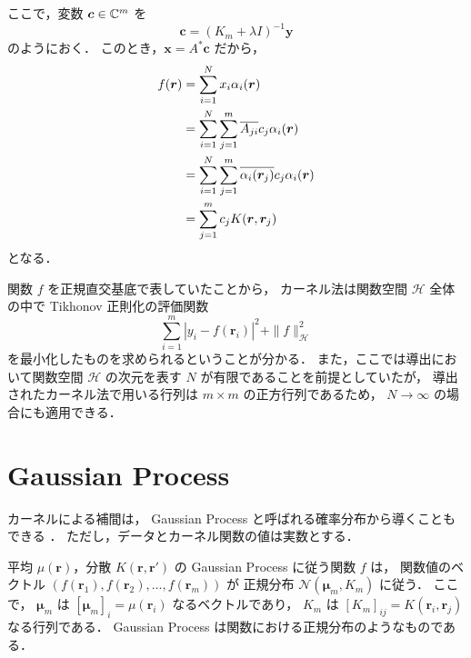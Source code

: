 ここで，変数 $\bm{c} \in \mathbb{C}^m$ を
\begin{equation}
    \bm{c} = (K_m + \lambda I)^{-1} \bm{y}
    \label{eq:interp_kernel_tikhonov_coeff_c}
\end{equation}
のようにおく．
このとき，$\bm{x} = A^* \bm{c}$ だから，
\begin{align}
    f(\bm{r})
     & = \sum_{i = 1}^{N} x_i \alpha_i(\bm{r}) \notag                                                \\
     & = \sum_{i = 1}^{N} \sum_{j = 1}^{m} \overline{A_{ji}} c_j \alpha_i(\bm{r}) \notag             \\
     & = \sum_{i = 1}^{N} \sum_{j = 1}^{m} \overline{\alpha_i(\bm{r}_j)} c_j \alpha_i(\bm{r}) \notag \\
     & = \sum_{j = 1}^{m} c_j K(\bm{r}, \bm{r}_j)
\end{align}
となる．

関数 $f$ を正規直交基底で表していたことから，
カーネル法は関数空間 $\mathcal{H}$ 全体の中で Tikhonov 正則化の評価関数
\begin{equation}
    \sum_{i=1}^m \left|y_i - f(\bm{r}_i)\right|^2
    + \|f\|_{\mathcal{H}}^2
\end{equation}
を最小化したものを求められるということが分かる．
また，ここでは導出において関数空間 $\mathcal{H}$ の次元を表す $N$ が有限であることを前提としていたが，
導出されたカーネル法で用いる行列は $m \times m$ の正方行列であるため，
$N \to \infty$ の場合にも適用できる．

\section{Gaussian Process}\label{sec:regularization_kernel_gaussian-process}

カーネルによる補間は，
Gaussian Process と呼ばれる確率分布から導くこともできる
\cite{Brochu2010}．
ただし，データとカーネル関数の値は実数とする．

平均 $\mu(\bm{r})$，分散 $K(\bm{r}, \bm{r}')$ の Gaussian Process に従う関数 $f$ は，
関数値のベクトル $(f(\bm{r}_1), f(\bm{r}_2), \ldots, f(\bm{r}_m))$ が
正規分布 $\mathcal{N}(\bm{\mu}_m, K_m)$ に従う．
ここで，
$\bm{\mu}_m$ は $[\bm{\mu}_m]_i = \mu(\bm{r}_i)$ なるベクトルであり，
$K_m$ は $[K_m]_{ij} = K(\bm{r}_i, \bm{r}_j)$ なる行列である．
Gaussian Process は関数における正規分布のようなものである．

